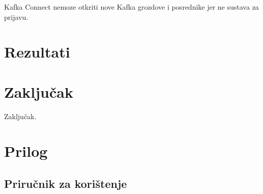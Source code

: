 \documentclass[times, utf8, diplomski, numeric]{fer}
\begin{document}
Kafka Connect nemoze otkriti nove Kafka grozdove i posrednike jer ne sustava za prijavu.

\chapter{Rezultati}

\chapter{Zaključak}
Zaključak.

\chapter{Prilog}

\section{Priručnik za korištenje}
\end{document}
